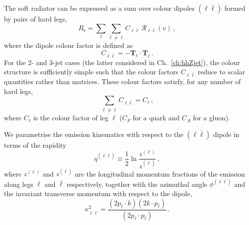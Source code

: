 The soft radiator can be expressed as a sum over colour dipoles
$(\ell\bar\ell)$ formed by pairs of hard legs,
\begin{equation}
	R_{\mathrm{s}}=\sum_{\ell}\sum_{\bar{\ell}\neq\ell} C_{\ell\bar{\ell}}\,\mathcal{R}_{\ell\bar\ell}(v)\,,
\end{equation}
where the dipole colour factor is defined as
\begin{equation}
\label{eq:Cellbell}
C_{\ell\bar{\ell}}=-\mathbf{T}_{\ell}\cdot\mathbf{T}_{\bar\ell}\,.
\end{equation}
For the 2- and 3-jet cases (the latter considered in
Ch.~\ref{ch:hhZjet}), the colour structure is sufficiently simple such that
the colour factors $C_{\ell\bar\ell}$ reduce to scalar quantities rather
than matrices. These colour factors satisfy, for any number of hard legs,
\begin{equation}
    \label{eq:Cl}
    \sum_{\bar \ell \ne \ell} C_{\ell \bar \ell}= C_\ell\,,
\end{equation}
where $C_\ell$ is the colour factor of leg $\ell$ ($C_F$ for a quark and $C_A$ for a gluon). 

We parametrise the emission kinematics with respect to 
the $(\ell\bar\ell)$ dipole in terms of the rapidity
\begin{equation}
    \eta^{(\ell\bar\ell)}
    \equiv \frac{1}{2}\ln\frac{z^{(\ell)}}{z^{(\bar\ell)}}\,,
\end{equation}
where $z^{(\ell)}$ and $z^{(\bar\ell)}$ are the longitudinal momentum
fractions of the emission along legs $\ell$ and $\bar\ell$ respectively,
together with the azimuthal angle
$\phi^{(\ell\bar\ell)}$ and the invariant transverse momentum
with respect to the dipole,
\begin{equation}
\label{eq:kappa}
    \kappa_{\ell\bar\ell}^2
    = \frac{(2p_\ell\cdot k)(2k\cdot p_{\bar\ell})}
           {(2p_\ell\cdot p_{\bar\ell})}\,.
\end{equation}

